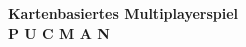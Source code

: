 \documentclass{beamer}
\begin{document}
\begin{comment}
\section{Grundsätzliche Struktur- und Entwurfsprinzipien}
Als grundsätzliche Programmiersprache haben wir uns für Java-Script entschieden, wobei der Java-Scriptcode von einer HTML-Seite aufgerufen wird. Desweiteren benutzen wir Phaser als Gameframework.
Ein Teil der Software wurde mithilfe von Funktionen aus der Java-Script Bibliothek JQuery geschrieben, da diese eine intuitive Herangehensweise bietet und für uns verständlicher als klassiches JavaScript ist.
Die von uns umgesetzte Web-Anwendung basiert auf einer Client-Server Architektur. Wir arbeiten mit einem HTML-Server auf dem die Daten liegen, die vom Client abgefragt und an diesen übertragen werden. Diese Daten beinhalten auch den Gameblock, der dann vom Client ausgeführt wird. Außerdem gibt es noch ein Map-Modul, welches das Level aus den Geo-Daten erstellt, die mithilfe der Overpass API von OpenStreetMaps bezogen werden. Dazu kommt das Highscore-Modul, welches für die Verwaltung der Highscores verantwortlich ist.
Desweiteren kommt noch ein Datenserver hinzu, der die Highscores unter Verwendung eines Triplestores speichert.\\
\begin{figure}[htb]
  \centering
  \texttt{[image: dia\_2.png]}
\caption{Architekur}
  \label{arch}
\end{figure} 
\section{Struktur- und Entwurfsprinzipien der einzelnen Pakete}
\subsection{Client}
\section{Datenmodell}
Siehe Abbildung \ref{arch}.\bigskip

Beschreibung zu Abbildung \ref{arch}: \\
$A \xlongrightarrow{\text{Datenfluß}} B $ beschreibt den Datenfluss von A nach B, wobei A und B Module der Software sind.
\clearpage
\end{comment}




\begin{frame}
\center \huge \textbf{Kartenbasiertes Multiplayerspiel} \\
\center \huge \textbf{P U C M A N}
\end{frame}
\end{document}
